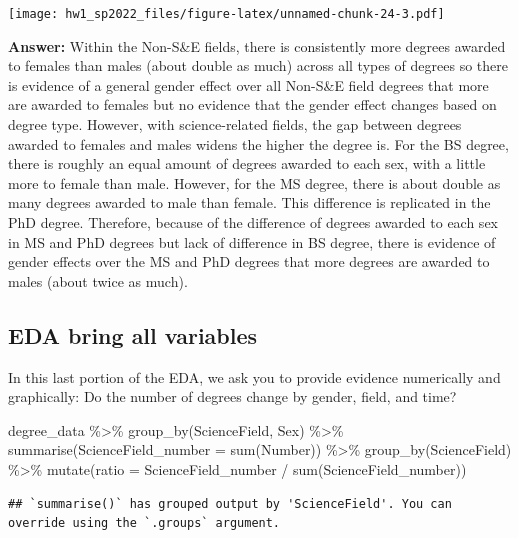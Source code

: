 \documentclass[
]{article}
\newenvironment{Shaded}{\begin{snugshade}}{\end{snugshade}}
\newcommand{\AttributeTok}[1]{\textcolor[rgb]{0.77,0.63,0.00}{#1}}
\newcommand{\FunctionTok}[1]{\textcolor[rgb]{0.00,0.00,0.00}{#1}}
\newcommand{\NormalTok}[1]{#1}
\newcommand{\SpecialCharTok}[1]{\textcolor[rgb]{0.00,0.00,0.00}{#1}}
\begin{document}
\texttt{[image: hw1\_sp2022\_files/figure-latex/unnamed-chunk-24-3.pdf]}

\textbf{Answer:} Within the Non-S\&E fields, there is consistently more
degrees awarded to females than males (about double as much) across all
types of degrees so there is evidence of a general gender effect over
all Non-S\&E field degrees that more are awarded to females but no
evidence that the gender effect changes based on degree type. However,
with science-related fields, the gap between degrees awarded to females
and males widens the higher the degree is. For the BS degree, there is
roughly an equal amount of degrees awarded to each sex, with a little
more to female than male. However, for the MS degree, there is about
double as many degrees awarded to male than female. This difference is
replicated in the PhD degree. Therefore, because of the difference of
degrees awarded to each sex in MS and PhD degrees but lack of difference
in BS degree, there is evidence of gender effects over the MS and PhD
degrees that more degrees are awarded to males (about twice as much).

\hypertarget{eda-bring-all-variables}{%
\subsection{EDA bring all variables}\label{eda-bring-all-variables}}

In this last portion of the EDA, we ask you to provide evidence
numerically and graphically: Do the number of degrees change by gender,
field, and time?

\begin{Shaded}
\begin{Highlighting}[]
\NormalTok{degree\_data }\SpecialCharTok{\%\textgreater{}\%}
  \FunctionTok{group\_by}\NormalTok{(ScienceField, Sex) }\SpecialCharTok{\%\textgreater{}\%}
  \FunctionTok{summarise}\NormalTok{(}\AttributeTok{ScienceField\_number =} \FunctionTok{sum}\NormalTok{(Number)) }\SpecialCharTok{\%\textgreater{}\%}
  \FunctionTok{group\_by}\NormalTok{(ScienceField) }\SpecialCharTok{\%\textgreater{}\%}
  \FunctionTok{mutate}\NormalTok{(}\AttributeTok{ratio =}\NormalTok{ ScienceField\_number }\SpecialCharTok{/} \FunctionTok{sum}\NormalTok{(ScienceField\_number))}
\end{Highlighting}
\end{Shaded}

\begin{verbatim}
## `summarise()` has grouped output by 'ScienceField'. You can override using the `.groups` argument.
\end{verbatim}
\end{document}
